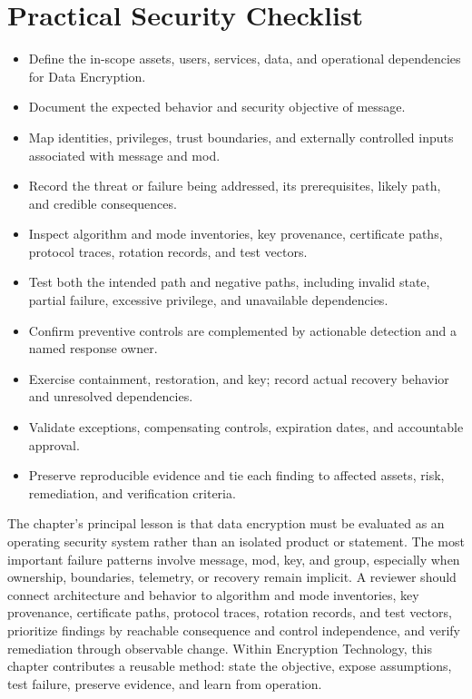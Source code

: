 \documentclass[11pt]{article}
\begin{document}
\section*{Practical Security Checklist}
\begin{itemize}[label=$\square$]
\item Define the in-scope assets, users, services, data, and operational dependencies for Data Encryption.
\item Document the expected behavior and security objective of message.
\item Map identities, privileges, trust boundaries, and externally controlled inputs associated with message and mod.
\item Record the threat or failure being addressed, its prerequisites, likely path, and credible consequences.
\item Inspect algorithm and mode inventories, key provenance, certificate paths, protocol traces, rotation records, and test vectors.
\item Test both the intended path and negative paths, including invalid state, partial failure, excessive privilege, and unavailable dependencies.
\item Confirm preventive controls are complemented by actionable detection and a named response owner.
\item Exercise containment, restoration, and key; record actual recovery behavior and unresolved dependencies.
\item Validate exceptions, compensating controls, expiration dates, and accountable approval.
\item Preserve reproducible evidence and tie each finding to affected assets, risk, remediation, and verification criteria.
\end{itemize}
\begin{synthesisbox}
The chapter's principal lesson is that data encryption must be evaluated as an operating security system rather than an isolated product or statement. The most important failure patterns involve message, mod, key, and group, especially when ownership, boundaries, telemetry, or recovery remain implicit. A reviewer should connect architecture and behavior to algorithm and mode inventories, key provenance, certificate paths, protocol traces, rotation records, and test vectors, prioritize findings by reachable consequence and control independence, and verify remediation through observable change. Within Encryption Technology, this chapter contributes a reusable method: state the objective, expose assumptions, test failure, preserve evidence, and learn from operation.
\end{synthesisbox}
\end{document}
